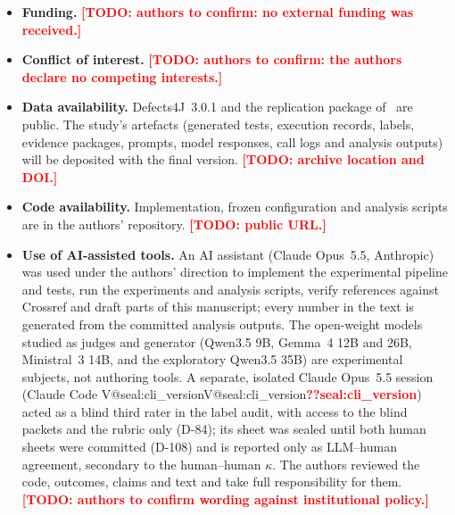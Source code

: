 \documentclass[pdflatex,iicol,sn-mathphys-num]{sn-jnl}
\makeatletter
\newcommand{\V}[1]{\ifcsname V@#1\endcsname\csname V@#1\endcsname\else\textbf{\textcolor{red}{??#1}}\fi}
\newcommand{\TODO}[1]{\textbf{\textcolor{red}{[TODO: #1]}}}
\makeatother
\begin{document}
\begin{itemize}
\item \textbf{Funding.} \TODO{authors to confirm: no external funding was received.}
\item \textbf{Conflict of interest.} \TODO{authors to confirm: the authors declare no competing interests.}
\item \textbf{Data availability.} Defects4J~3.0.1 and the replication package of~\cite{zhao2026misguidance} are public. The study's artefacts (generated tests, execution records, labels, evidence packages, prompts, model responses, call logs and analysis outputs) will be deposited with the final version. \TODO{archive location and DOI.}
\item \textbf{Code availability.} Implementation, frozen configuration and analysis scripts are in the authors' repository. \TODO{public URL.}
\item \textbf{Use of AI-assisted tools.} An AI assistant (Claude Opus~5.5, Anthropic) was used under the authors' direction to implement the experimental pipeline and tests, run the experiments and analysis scripts, verify references against Crossref and draft parts of this manuscript; every number in the text is generated from the committed analysis outputs. The open-weight models studied as judges and generator (Qwen3.5 9B, Gemma~4 12B and 26B, Ministral~3 14B, and the exploratory Qwen3.5 35B) are experimental subjects, not authoring tools. A separate, isolated Claude Opus~5.5 session (Claude Code \V{seal:cli_version}) acted as a blind third rater in the label audit, with access to the blind packets and the rubric only (D-84); its sheet was sealed until both human sheets were committed (D-108) and is reported only as LLM--human agreement, secondary to the human--human $\kappa$. The authors reviewed the code, outcomes, claims and text and take full responsibility for them. \TODO{authors to confirm wording against institutional policy.}
\end{itemize}
\end{document}
